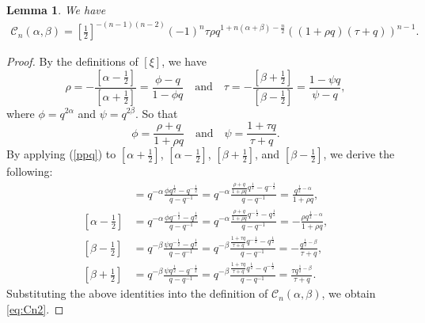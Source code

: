 \documentclass[12pt, a4paper]{amsart} %
\numberwithin{equation}{section}
\newtheorem{lemma}[theorem]{Lemma}
\begin{document}
\begin{lemma}\label{lem:Cn}
	We have
\begin{align}\label{eq:Cn2}
	\mathcal{C}_n(\alpha, \beta) = [\frac12]^{-{(n-1)(n-2)}}  (-1)^{n} \tau \rho q^{1+n(\alpha+\beta) -\frac{n}{2}}((1+\rho q)(\tau +q))^{n-1}.
\end{align}
\end{lemma}
\begin{proof}
By the definitions of $[\xi]$, we have
\begin{equation*}
    \rho = -\frac{[\alpha-\frac{1}{2}]}{[\alpha+\frac{1}{2}]} 
         = \frac{\phi-q}{1-\phi q} 
    \quad \text{and} \quad 
    \tau = -\frac{[\beta+\frac{1}{2}]}{[\beta-\frac{1}{2}]}
         = \frac{1-\psi q}{\psi - q},
\end{equation*}
where $\phi=q^{2\alpha}$ and $\psi=q^{2\beta}$.  
So that
\begin{equation}\label{ppq}
    \phi=\frac{\rho+q}{1+\rho q} 
    \quad \text{and} \quad 
    \psi=\frac{1+\tau q}{\tau +q}.
\end{equation}
By applying (\ref{ppq}) to $[\alpha+\frac{1}{2}]$, $[\alpha-\frac{1}{2}]$,  $[\beta +\frac{1}{2}]$, and $[\beta -\frac{1}{2}]$, we derive the following:
\begin{align*}
	[\alpha+\frac{1}{2}]&=q^{-\alpha}\frac{\phi q^{\frac{1}{2}}-q^{-\frac{1}{2}}}{q-q^{-1}}=q^{-\alpha}\frac{ \frac{\rho+q}{1+\rho q}  q^{\frac{1}{2}}-q^{-\frac{1}{2}}}{q-q^{-1}}=\frac{q^{\frac{1}{2}-\alpha}}{1+\rho q},\\
	[\alpha-\frac{1}{2}]&=q^{-\alpha}\frac{\phi q^{-\frac{1}{2}}-q^{\frac{1}{2}}}{q-q^{-1}}=q^{-\alpha}\frac{  \frac{\rho+q}{1+\rho q} q^{-\frac{1}{2}}-q^{\frac{1}{2}}}{q-q^{-1}}=-\frac{\rho q^{\frac{1}{2}-\alpha}}{1+\rho q},\\
	[\beta-\frac{1}{2}]&=q^{-\beta}\frac{\psi q^{-\frac{1}{2}}-q^{\frac{1}{2}}}{q-q^{-1}}= q^{-\beta}\frac{ \frac{1+\tau q}{\tau +q}  q^{-\frac{1}{2}}-q^{\frac{1}{2}}}{q-q^{-1}}=-\frac{q^{\frac{1}{2}-\beta}}{\tau+q},\\
	[\beta + \frac{1}{2}]&= q^{-\beta}\frac{\psi q^{\frac{1}{2}}-q^{-\frac{1}{2}}}{q-q^{-1}}= q^{-\beta}\frac{ \frac{1+\tau q}{\tau +q}  q^{\frac{1}{2}}-q^{-\frac{1}{2}}}{q-q^{-1}}=\frac{\tau q^{\frac{1}{2}-\beta}}{\tau+q}.
\end{align*}
	Substituting the above identities into the definition of $\mathcal{C}_n(\alpha, \beta)$, we obtain \eqref{eq:Cn2}.
\end{proof}
\end{document}
